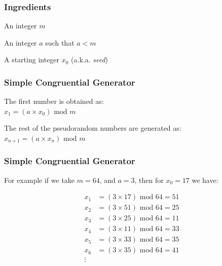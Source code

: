 \documentclass[12pt]{beamer}\usepackage[]{graphicx}\usepackage[]{color}
\begin{document}

\begin{frame}
\frametitle{Ingredients}

\bi
  \item An integer $m$
  \item An integer $a$ such that $a < m$
  \item A starting integer $x_0$ (a.k.a. \textit{seed})
\ei

\end{frame}


\begin{frame}[fragile]
\frametitle{Simple Congruential Generator}

The first number is obtained as: \\
$
x_{1} = (a \times x_{0}) \text{ mod } m
$

\bigskip
The rest of the pseudorandom numbers are generated as:\\
$
x_{n+1} = (a \times x_{n}) \text{ mod } m
$
\end{frame}


\begin{frame}[fragile]
\frametitle{Simple Congruential Generator}

For example if we take $m = 64$, and $a = 3$, then for $x_0 = 17$ we have:

\begin{align*} 
x_1 &= (3 \times 17) \text{ mod } 64 = 51 \\ 
x_2 &= (3 \times 51) \text{ mod } 64 = 25 \\
x_3 &= (3 \times 25) \text{ mod } 64 = 11 \\
x_4 &= (3 \times 11) \text{ mod } 64 = 33 \\ 
x_5 &= (3 \times 33) \text{ mod } 64 = 35 \\
x_6 &= (3 \times 35) \text{ mod } 64 = 41 \\
\vdots \\
\end{align*}

\end{frame}

\end{document}
